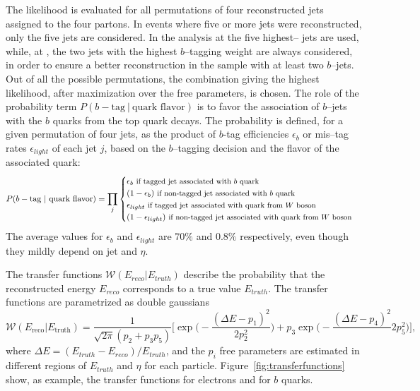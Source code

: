 The likelihood is evaluated for all permutations of four reconstructed
jets assigned to the four partons.
In events where five or more jets were reconstructed, only
the five jets are considered. In the analysis at \seventev{} the five
highest--\pt{} jets are used, while, at \eighttev{}, the two jets with the
highest $b$--tagging weight are always considered, in order to ensure
a better reconstruction in the sample with at least two $b$--jets.
Out of all the possible permutations, the combination giving the
highest likelihood, after maximization over the free parameters, is chosen.
The role of the probability term $P(b-\textrm{tag} ~|
~\textrm{quark flavor})$ is to favor the association of $b$--jets with
the $b$ quarks from the top quark decays. The probability is defined,
for a given permutation of four jets, as the product of $b$-tag
efficiencies $\epsilon_b$ or mis--tag rates $\epsilon_{light}$ of each
jet $j$, based on the $b$--tagging decision and the flavor of the
associated quark:
\begin{equation}
P(b-\textrm{tag}~|~\textrm{quark flavor}) = \prod_{j}
\begin{cases}
\epsilon_b~\text{\small{if tagged jet associated with $b$ quark}}\\
(1-\epsilon_b)~\text{\small{if non-tagged jet associated with $b$ quark}} \\
\epsilon_{light}~\text{\small{if tagged jet associated with quark from
  $W$ boson}} \\
(1-\epsilon_{light})~\text{\small{if non-tagged jet associated with quark from
  $W$ boson}} \\
\end{cases}
\end{equation}
The average values for $\epsilon_b$ and $\epsilon_{light}$ are $70\%$
and $0.8\%$ respectively, even though they mildly depend on
jet \pt{} and $\eta$. 

The transfer functions $\mathcal{W}(E_{reco}|E_{truth})$ describe the probability that the
reconstructed energy $E_{reco}$ corresponds to a true value
$E_{truth}$.
The transfer functions are parametrized as double gaussians
\begin{equation}
  \label{eq:doublegaus}
  \mathcal{W}(E_\mathrm{reco}|E_\mathrm{truth}) = \frac{1}{\sqrt{2\pi}(p_2+p_3p_5)}\Bigg[ \exp\Bigg(-\frac{(\Delta E - p_1)^2}{2p_2^2}\Bigg) + p_3\exp\Bigg(-\frac{(\Delta E - p_4)^2}\
  {2p_5^2}\Bigg) \Bigg],
\end{equation}
where $\Delta E = (E_{truth}-E_{reco})/E_{truth}$, and the $p_i$
free parameters are estimated in different regions of $E_{truth}$ and
$\eta$ for each particle. Figure~\ref{fig:transferfunctions} show, as
example, the transfer functions for electrons and for $b$ quarks.

